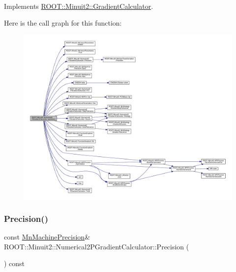 Implements \mbox{\hyperlink{classROOT_1_1Minuit2_1_1GradientCalculator_a1809c1e8a89d32aabf7835e9690c2916}{R\+O\+O\+T\+::\+Minuit2\+::\+Gradient\+Calculator}}.

Here is the call graph for this function\+:\nopagebreak
\begin{figure}[H]
\begin{center}
\leavevmode
\includegraphics[width=350pt]{d0/d82/classROOT_1_1Minuit2_1_1Numerical2PGradientCalculator_a89c825ba34455277290940fa62fc5321_cgraph}
\end{center}
\end{figure}
\mbox{\label{classROOT_1_1Minuit2_1_1Numerical2PGradientCalculator_a2f964953d797badaf6f2cd476e330c3f}} 
\subsubsection{\texorpdfstring{Precision()}{Precision()}\hspace{0.1cm}{\footnotesize\ttfamily [1/2]}}
{\footnotesize\ttfamily const \mbox{\hyperlink{classROOT_1_1Minuit2_1_1MnMachinePrecision}{Mn\+Machine\+Precision}}\& R\+O\+O\+T\+::\+Minuit2\+::\+Numerical2\+P\+Gradient\+Calculator\+::\+Precision (\begin{DoxyParamCaption}{ }\end{DoxyParamCaption}) const}


